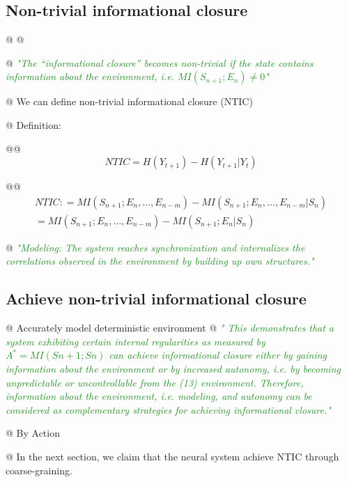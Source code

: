 \documentclass[utf8]{article}
\newenvironment{ants}
			{
			 \begin{easylist}[itemize]		
		 	}
			{
			\end{easylist}
			}
\newcommand{\rewrite}[1]{\textcolor{ForestGreen}{\textit{"#1"}}\newline}
\newcommand{\callforhelp}[1]{\todo[color=SpringGreen]{#1}}
\begin{document}
		
		
		\subsection{Non-trivial informational closure}
			\begin{ants}
				
				@ \citep{BERTSCHINGER.2006}
				@ \citep{guttenberg2016neural}

				@ \rewrite{The “informational closure” becomes non-trivial if the state contains information about the environment, i.e. $MI(S_{n+1};E_{n})\neq0$}
	
				@ We can define non-trivial informational closure (NTIC)
				
				@ Definition:\callforhelp{Which def is better? }
				
					@@
					\begin{equation}
					N T I C = H ( Y _ { t + 1} ) - H ( Y _ { t + 1} | Y _ { t } )
					\end{equation}
					\citep{guttenberg2016neural}
					
					@@
					\begin{equation}
					\left.\begin{array}{l}{ N T I C  : = M I ( S _ { n + 1} ; E _ { n } ,\dots ,E _ { n - m } ) - M I ( S _ { n + 1} ; E _ { n } ,\dots ,E _ { n - m } | S _ { n } ) }\\{  = M I ( S _ { n + 1} ; E _ { n } ,\dots ,E _ { n - m } ) - M I ( S _ { n + 1} ; E _ { n } | S _ { n } ) }\end{array} \right.
					\end{equation}
					\cite{BERTSCHINGER.2006}
					
					
				@ \rewrite{Modeling: The system reaches synchronization and internalizes the correlations observed in the environment by building up own structures.}
				
			\end{ants}
		

		
		\subsection{Achieve non-trivial informational closure}
			\begin{ants}

				@ Accurately model deterministic environment 
				@ \rewrite{
					This demonstrates that a system exhibiting certain internal regularities as measured by $A^* = MI(Sn+1; Sn)$ can achieve informational closure either by gaining information about the environment or by increased autonomy, i.e. by becoming unpredictable or uncontrollable from the (13) environment. Therefore, information about the environment, i.e. modeling, and autonomy can be considered as complementary strategies for achieving informational closure.}
				
				@ By Action 
				
				@ In the next section, we claim that the neural system achieve NTIC through coarse-graining.
				
			\end{ants}
\end{document}
